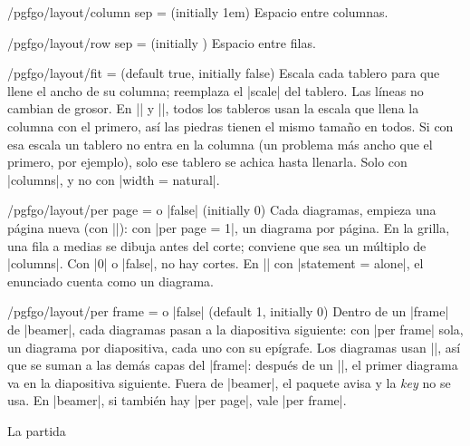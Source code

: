 \begin{key}{/pgfgo/layout/column sep =  (initially 1em)}
	Espacio entre columnas.
\end{key}

\begin{key}{/pgfgo/layout/row sep =  (initially \texttt{\string\medskipamount})}
	Espacio entre filas.
\end{key}

\begin{key}{/pgfgo/layout/fit =  (default true, initially false)}
	Escala cada tablero para que llene el ancho de su columna; reemplaza el |scale| del tablero. Las líneas no cambian de grosor. En |\sgfdiagrams| y |\sgfproblem|, todos los tableros usan la escala que llena la columna con el primero, así las piedras tienen el mismo tamaño en todos. Si con esa escala un tablero no entra en la columna (un problema más ancho que el primero, por ejemplo), solo ese tablero se achica hasta llenarla. Solo con |columns|, y no con |width = natural|.
\end{key}

\begin{key}{/pgfgo/layout/per page =  o |false| (initially 0)}
	Cada  diagramas, empieza una página nueva (con |\newpage|): con |per page = 1|, un diagrama por página. En la grilla, una fila a medias se dibuja antes del corte; conviene que  sea un múltiplo de |columns|. Con |0| o |false|, no hay cortes. En |\sgfproblem| con |statement = alone|, el enunciado cuenta como un diagrama.

	\begin{codeexample}
	\end{codeexample}
\end{key}

\begin{key}{/pgfgo/layout/per frame =  o |false| (default 1, initially 0)}
	Dentro de un |frame| de |beamer|, cada  diagramas pasan a la diapositiva siguiente: con |per frame| sola, un diagrama por diapositiva, cada uno con su epígrafe. Los diagramas usan |\only<+>|, así que se suman a las demás capas del |frame|: después de un |\pause|, el primer diagrama va en la diapositiva siguiente. Fuera de |beamer|, el paquete avisa y la \emph{key} no se usa. En |beamer|, si también hay |per page|, vale |per frame|.

	\begin{codeexample}
		\begin{frame}{La partida}
		\end{frame}
	\end{codeexample}
\end{key}

